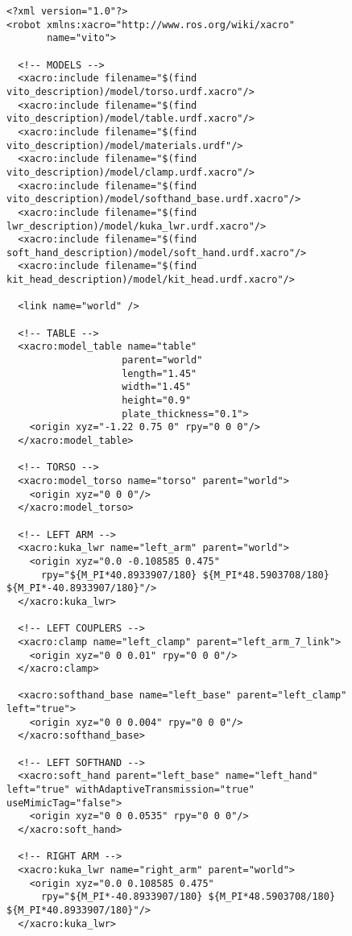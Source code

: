 \begin{figure}
\tiny
\begin{verbatim}
<?xml version="1.0"?>
<robot xmlns:xacro="http://www.ros.org/wiki/xacro" 
       name="vito">
       
  <!-- MODELS -->
  <xacro:include filename="$(find vito_description)/model/torso.urdf.xacro"/>
  <xacro:include filename="$(find vito_description)/model/table.urdf.xacro"/>
  <xacro:include filename="$(find vito_description)/model/materials.urdf"/>
  <xacro:include filename="$(find vito_description)/model/clamp.urdf.xacro"/>
  <xacro:include filename="$(find vito_description)/model/softhand_base.urdf.xacro"/>
  <xacro:include filename="$(find lwr_description)/model/kuka_lwr.urdf.xacro"/>
  <xacro:include filename="$(find soft_hand_description)/model/soft_hand.urdf.xacro"/>
  <xacro:include filename="$(find kit_head_description)/model/kit_head.urdf.xacro"/>
    
  <link name="world" />
  
  <!-- TABLE -->
  <xacro:model_table name="table" 
                    parent="world"
                    length="1.45"
                    width="1.45"
                    height="0.9"
                    plate_thickness="0.1">
    <origin xyz="-1.22 0.75 0" rpy="0 0 0"/>
  </xacro:model_table>

  <!-- TORSO -->
  <xacro:model_torso name="torso" parent="world">
    <origin xyz="0 0 0"/>
  </xacro:model_torso>
  
  <!-- LEFT ARM -->
  <xacro:kuka_lwr name="left_arm" parent="world">
    <origin xyz="0.0 -0.108585 0.475" 
      rpy="${M_PI*40.8933907/180} ${M_PI*48.5903708/180} ${M_PI*-40.8933907/180}"/>
  </xacro:kuka_lwr>

  <!-- LEFT COUPLERS -->
  <xacro:clamp name="left_clamp" parent="left_arm_7_link">
    <origin xyz="0 0 0.01" rpy="0 0 0"/>
  </xacro:clamp>

  <xacro:softhand_base name="left_base" parent="left_clamp" left="true">
    <origin xyz="0 0 0.004" rpy="0 0 0"/>
  </xacro:softhand_base>

  <!-- LEFT SOFTHAND -->
  <xacro:soft_hand parent="left_base" name="left_hand" left="true" withAdaptiveTransmission="true" useMimicTag="false">
    <origin xyz="0 0 0.0535" rpy="0 0 0"/>
  </xacro:soft_hand>

  <!-- RIGHT ARM -->
  <xacro:kuka_lwr name="right_arm" parent="world">
    <origin xyz="0.0 0.108585 0.475" 
      rpy="${M_PI*-40.8933907/180} ${M_PI*48.5903708/180} ${M_PI*40.8933907/180}"/>
  </xacro:kuka_lwr>


\end{verbatim}
\end{figure}
